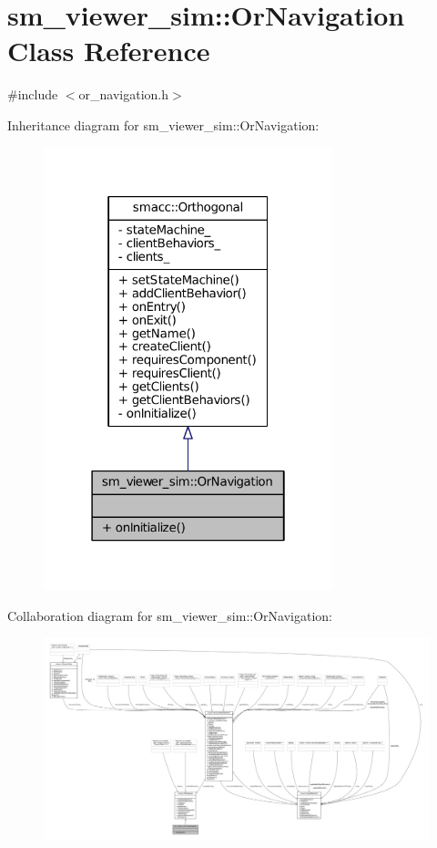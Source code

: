 \hypertarget{classsm__viewer__sim_1_1OrNavigation}{}\section{sm\+\_\+viewer\+\_\+sim\+:\+:Or\+Navigation Class Reference}
\label{classsm__viewer__sim_1_1OrNavigation}


{\ttfamily \#include $<$or\+\_\+navigation.\+h$>$}



Inheritance diagram for sm\+\_\+viewer\+\_\+sim\+:\+:Or\+Navigation\+:
\nopagebreak
\begin{figure}[H]
\begin{center}
\leavevmode
\includegraphics[width=238pt]{classsm__viewer__sim_1_1OrNavigation__inherit__graph}
\end{center}
\end{figure}


Collaboration diagram for sm\+\_\+viewer\+\_\+sim\+:\+:Or\+Navigation\+:
\nopagebreak
\begin{figure}[H]
\begin{center}
\leavevmode
\includegraphics[width=350pt]{classsm__viewer__sim_1_1OrNavigation__coll__graph}
\end{center}
\end{figure}
